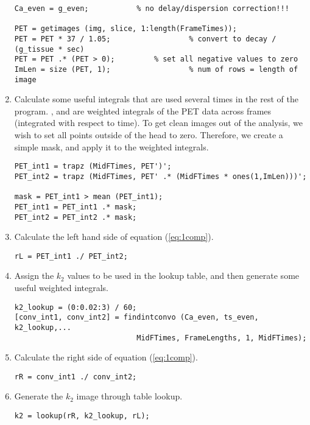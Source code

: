 \begin{enumerate}
\begin{verbatim}
Ca_even = g_even; 			% no delay/dispersion correction!!!

PET = getimages (img, slice, 1:length(FrameTimes));
PET = PET * 37 / 1.05;                  % convert to decay / (g_tissue * sec)
PET = PET .* (PET > 0);			% set all negative values to zero
ImLen = size (PET, 1);                  % num of rows = length of image
\end{verbatim}

\item Calculate some useful integrals that are used several times in
the rest of the program.  , and  are
weighted integrals of the PET data across frames (integrated with
respect to time).  To get clean images out of the analysis, we wish to
set all points outside of the head to zero.  Therefore, we create a
simple mask, and apply it to the weighted integrals.
\begin{verbatim}
PET_int1 = trapz (MidFTimes, PET')';
PET_int2 = trapz (MidFTimes, PET' .* (MidFTimes * ones(1,ImLen)))';

mask = PET_int1 > mean (PET_int1);
PET_int1 = PET_int1 .* mask;
PET_int2 = PET_int2 .* mask;
\end{verbatim}

\item Calculate the left hand side of equation (\ref{eq:1comp}).
\begin{verbatim}
rL = PET_int1 ./ PET_int2;
\end{verbatim}

\item Assign the $k_2$ values to be used in the lookup table, and then
generate some useful weighted integrals.
\begin{verbatim}
k2_lookup = (0:0.02:3) / 60;
[conv_int1, conv_int2] = findintconvo (Ca_even, ts_even, k2_lookup,...
                            MidFTimes, FrameLengths, 1, MidFTimes);
\end{verbatim}

\item Calculate the right side of equation (\ref{eq:1comp}).
\begin{verbatim}
rR = conv_int1 ./ conv_int2;
\end{verbatim}

\item Generate the $k_2$ image through table lookup.
\begin{verbatim}
k2 = lookup(rR, k2_lookup, rL);
\end{verbatim}


\end{enumerate}
